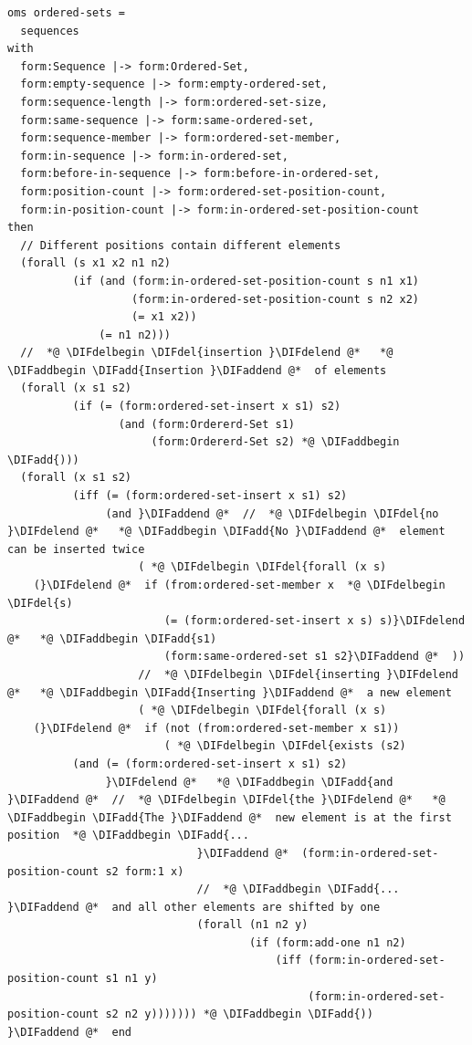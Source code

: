 \documentclass[10pt,fleqn,final]{scrreprt}
\providecommand{\DIFadd}[1]{{\protect\color{blue}\uwave{#1}}} %
\providecommand{\DIFdel}[1]{{\protect\color{red}\sout{#1}}}                      %
\providecommand{\DIFaddbegin}{} %
\providecommand{\DIFaddend}{} %
\providecommand{\DIFdelbegin}{} %
\providecommand{\DIFdelend}{} %
\begin{document}
\begin{lstlisting}[language=clif,morekeywords={then,with,logic,oms,end},mathescape]
oms ordered-sets =
  sequences
with
  form:Sequence |-> form:Ordered-Set,
  form:empty-sequence |-> form:empty-ordered-set,
  form:sequence-length |-> form:ordered-set-size,
  form:same-sequence |-> form:same-ordered-set,
  form:sequence-member |-> form:ordered-set-member,
  form:in-sequence |-> form:in-ordered-set,
  form:before-in-sequence |-> form:before-in-ordered-set,
  form:position-count |-> form:ordered-set-position-count,
  form:in-position-count |-> form:in-ordered-set-position-count
then
  // Different positions contain different elements
  (forall (s x1 x2 n1 n2)
          (if (and (form:in-ordered-set-position-count s n1 x1)
                   (form:in-ordered-set-position-count s n2 x2)
                   (= x1 x2))
              (= n1 n2)))
  //  *@ \DIFdelbegin \DIFdel{insertion }\DIFdelend @*   *@ \DIFaddbegin \DIFadd{Insertion }\DIFaddend @*  of elements
  (forall (x s1 s2)
          (if (= (form:ordered-set-insert x s1) s2)
                 (and (form:Ordererd-Set s1)
                      (form:Ordererd-Set s2) *@ \DIFaddbegin \DIFadd{)))
  (forall (x s1 s2)
          (iff (= (form:ordered-set-insert x s1) s2)
               (and }\DIFaddend @*  //  *@ \DIFdelbegin \DIFdel{no }\DIFdelend @*   *@ \DIFaddbegin \DIFadd{No }\DIFaddend @*  element can be inserted twice
                    ( *@ \DIFdelbegin \DIFdel{forall (x s)
    (}\DIFdelend @*  if (from:ordered-set-member x  *@ \DIFdelbegin \DIFdel{s)
                        (= (form:ordered-set-insert x s) s)}\DIFdelend @*   *@ \DIFaddbegin \DIFadd{s1)
                        (form:same-ordered-set s1 s2}\DIFaddend @*  ))
                    //  *@ \DIFdelbegin \DIFdel{inserting }\DIFdelend @*   *@ \DIFaddbegin \DIFadd{Inserting }\DIFaddend @*  a new element
                    ( *@ \DIFdelbegin \DIFdel{forall (x s)
    (}\DIFdelend @*  if (not (from:ordered-set-member x s1))
                        ( *@ \DIFdelbegin \DIFdel{exists (s2)
          (and (= (form:ordered-set-insert x s1) s2)     
               }\DIFdelend @*   *@ \DIFaddbegin \DIFadd{and }\DIFaddend @*  //  *@ \DIFdelbegin \DIFdel{the }\DIFdelend @*   *@ \DIFaddbegin \DIFadd{The }\DIFaddend @*  new element is at the first position  *@ \DIFaddbegin \DIFadd{...
                             }\DIFaddend @*  (form:in-ordered-set-position-count s2 form:1 x)
                             //  *@ \DIFaddbegin \DIFadd{... }\DIFaddend @*  and all other elements are shifted by one
                             (forall (n1 n2 y)
                                     (if (form:add-one n1 n2)
                                         (iff (form:in-ordered-set-position-count s1 n1 y)
                                              (form:in-ordered-set-position-count s2 n2 y))))))) *@ \DIFaddbegin \DIFadd{))
}\DIFaddend @*  end


\end{lstlisting}
\end{document}
